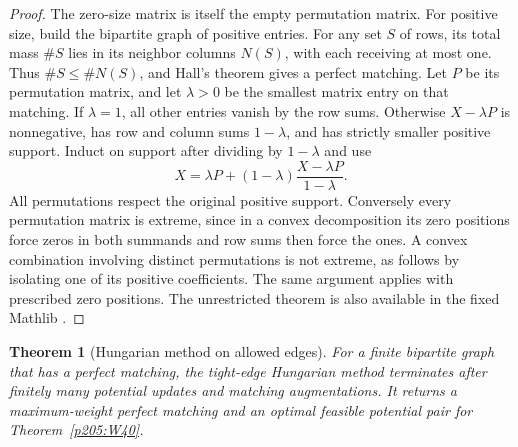 \documentclass[11pt,oneside,openany]{book}
\theoremstyle{plain}
\newtheorem{theorem}{Theorem}[chapter]
\theoremstyle{definition}
\theoremstyle{remark}
\begin{document}
\begin{proof}
The zero-size matrix is itself the empty permutation matrix.
For positive size, build the bipartite graph of positive entries.
For any set \(S\) of rows, its total mass \(\#S\) lies in its
neighbor columns \(N(S)\), with each receiving at most one.
Thus \(\#S\le\#N(S)\), and Hall's theorem
\cite[Chapter 8, W51]{p204} gives a perfect matching.
Let \(P\) be its permutation matrix, and let \(\lambda>0\)
be the smallest matrix entry on that matching. If \(\lambda=1\),
all other entries vanish by the row sums. Otherwise \(X-\lambda P\)
is nonnegative, has row and column sums \(1-\lambda\), and has
strictly smaller positive support. Induct on support after dividing
by \(1-\lambda\) and use
\[
             X=\lambda P+(1-\lambda)\frac{X-\lambda P}{1-\lambda}.
\]
All permutations respect the original positive support. Conversely
every permutation matrix is extreme, since in a convex
decomposition its zero positions force zeros in both summands
and row sums then force the ones. A convex combination involving
distinct permutations is not extreme, as follows by isolating
one of its positive coefficients. The same argument applies with
prescribed zero positions. The unrestricted theorem is also
available in the fixed Mathlib \cite{mathlib}.
\end{proof}

\begin{theorem}[Hungarian method on allowed edges]\label{p205:W43}
For a finite bipartite graph that has a perfect matching, the
tight-edge Hungarian method terminates after finitely many
potential updates and matching augmentations. It returns a
maximum-weight perfect matching and an optimal feasible potential
pair for Theorem~\ref{p205:W40}.
\end{theorem}
\end{document}
